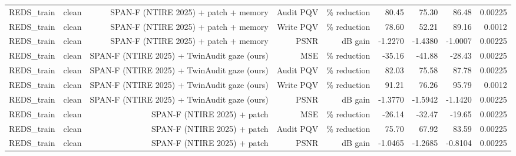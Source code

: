 \begin{table}[t]
\begin{tabular}{llrrrrrrr}
REDS\_train & clean & SPAN-F (NTIRE 2025) + patch + memory & Audit PQV & \% reduction & 80.45 & 75.30 & 86.48 & 0.00225 \\
REDS\_train & clean & SPAN-F (NTIRE 2025) + patch + memory & Write PQV & \% reduction & 78.60 & 52.21 & 89.16 & 0.0012 \\
REDS\_train & clean & SPAN-F (NTIRE 2025) + patch + memory & PSNR & dB gain & -1.2270 & -1.4380 & -1.0007 & 0.00225 \\
REDS\_train & clean & SPAN-F (NTIRE 2025) + TwinAudit gaze (ours) & MSE & \% reduction & -35.16 & -41.88 & -28.43 & 0.00225 \\
REDS\_train & clean & SPAN-F (NTIRE 2025) + TwinAudit gaze (ours) & Audit PQV & \% reduction & 82.03 & 75.58 & 87.78 & 0.00225 \\
REDS\_train & clean & SPAN-F (NTIRE 2025) + TwinAudit gaze (ours) & Write PQV & \% reduction & 91.21 & 76.26 & 95.79 & 0.0012 \\
REDS\_train & clean & SPAN-F (NTIRE 2025) + TwinAudit gaze (ours) & PSNR & dB gain & -1.3770 & -1.5942 & -1.1420 & 0.00225 \\
REDS\_train & clean & SPAN-F (NTIRE 2025) + patch & MSE & \% reduction & -26.14 & -32.47 & -19.65 & 0.00225 \\
REDS\_train & clean & SPAN-F (NTIRE 2025) + patch & Audit PQV & \% reduction & 75.70 & 67.92 & 83.59 & 0.00225 \\
REDS\_train & clean & SPAN-F (NTIRE 2025) + patch & PSNR & dB gain & -1.0465 & -1.2685 & -0.8104 & 0.00225 \\
\bottomrule
\end{tabular}
\end{table}
